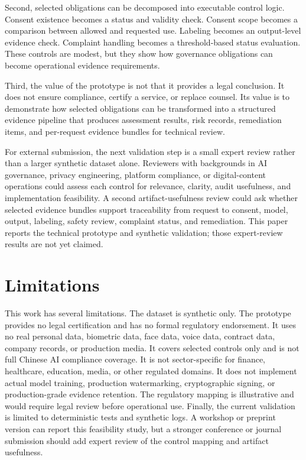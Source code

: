 \documentclass[10pt,journal]{IEEEtran}
\begin{document}
Second, selected obligations can be decomposed into executable control logic. Consent existence becomes a status and validity check. Consent scope becomes a comparison between allowed and requested use. Labeling becomes an output-level evidence check. Complaint handling becomes a threshold-based status evaluation. These controls are modest, but they show how governance obligations can become operational evidence requirements.

Third, the value of the prototype is not that it provides a legal conclusion. It does not ensure compliance, certify a service, or replace counsel. Its value is to demonstrate how selected obligations can be transformed into a structured evidence pipeline that produces assessment results, risk records, remediation items, and per-request evidence bundles for technical review.


For external submission, the next validation step is a small expert review rather than a larger synthetic dataset alone. Reviewers with backgrounds in AI governance, privacy engineering, platform compliance, or digital-content operations could assess each control for relevance, clarity, audit usefulness, and implementation feasibility. A second artifact-usefulness review could ask whether selected evidence bundles support traceability from request to consent, model, output, labeling, safety review, complaint status, and remediation. This paper reports the technical prototype and synthetic validation; those expert-review results are not yet claimed.

\section{Limitations}

This work has several limitations. The dataset is synthetic only. The prototype provides no legal certification and has no formal regulatory endorsement. It uses no real personal data, biometric data, face data, voice data, contract data, company records, or production media. It covers selected controls only and is not full Chinese AI compliance coverage. It is not sector-specific for finance, healthcare, education, media, or other regulated domains. It does not implement actual model training, production watermarking, cryptographic signing, or production-grade evidence retention. The regulatory mapping is illustrative and would require legal review before operational use. Finally, the current validation is limited to deterministic tests and synthetic logs. A workshop or preprint version can report this feasibility study, but a stronger conference or journal submission should add expert review of the control mapping and artifact usefulness.
\end{document}
